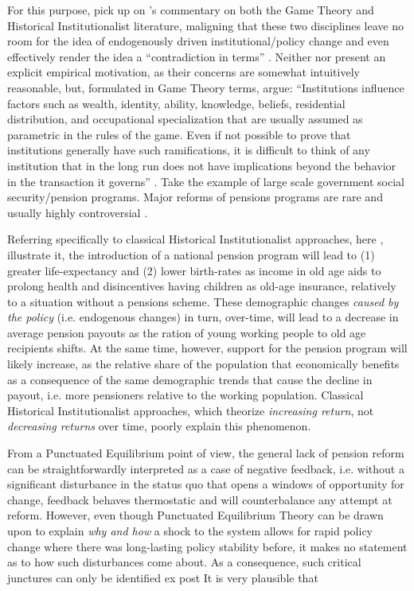 \documentclass[11pt]{article}
\begin{document}
For this purpose, \textcite[][]{Jacobs2014} pick up on \citeauthor{Greif2004}'s \parencite*{Greif2004} commentary on both the Game Theory and Historical Institutionalist literature, maligning that these two disciplines leave no room for the idea of endogenously driven institutional/policy change and even effectively render the idea a \enquote{contradiction in terms} \parencite[][p. 633]{Greif2004}. Neither \textcite[][]{Jacobs2014} nor \textcite[][]{Greif2004} present an explicit empirical motivation, as their concerns are somewhat intuitively reasonable, but, formulated in Game Theory terms, \textcite[][]{Greif2004} argue: \enquote{Institutions influence factors such as wealth, identity, ability, knowledge, beliefs, residential distribution, and occupational specialization that are usually assumed as parametric in the rules of the game. Even if not possible to prove that institutions generally have such ramifications, it is difficult to think of any institution that in the long run does not have implications beyond the behavior in the transaction it governs} \textcite[][p. 636]{Greif2004}. Take the example of large scale government social security/pension programs. Major reforms of pensions programs are rare and usually highly controversial  \parencite[see e.g. recent attempts in France to raise the retirement age][]{Leali2023}.

Referring specifically to classical Historical Institutionalist approaches, here \textcite[][]{Pierson2000}, \textcite{Greif2004} illustrate it, the introduction of a national pension program will lead to (1) greater life-expectancy and (2) lower birth-rates as income in old age aids to prolong health and disincentives having children as old-age insurance, relatively to a situation without a pensions scheme. These demographic changes \textit{caused by the policy} (i.e. endogenous changes) in turn, over-time, will lead to a decrease in average pension payouts as the ration of young working people to old age recipients shifts. At the same time, however, support for the pension program will likely increase, as the relative share of the population that economically benefits as a consequence of the same demographic trends that cause the decline in payout, i.e. more pensioners relative to the working population. Classical Historical Institutionalist approaches, which theorize \textit{increasing return}, not \textit{decreasing returns} over time, poorly explain this phenomenon.

From a Punctuated Equilibrium point of view, the general lack of pension reform can be straightforwardly interpreted as a case of negative feedback, i.e. without a significant disturbance in the status quo that opens a windows of opportunity for change, feedback behaves thermostatic and will counterbalance any attempt at reform. However, even though Punctuated Equilibrium Theory can be drawn upon to explain \textit{why and how} a shock to the system allows for rapid policy change where there was long-lasting policy stability before, it makes no statement as to how such disturbances come about. As a consequence, such critical junctures can only be identified ex post It is very plausible that
\end{document}
